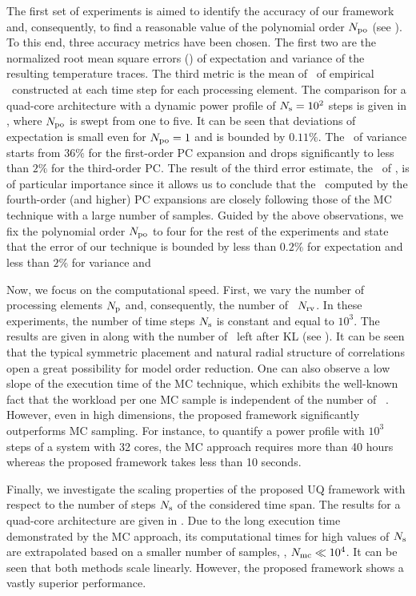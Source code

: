 
The first set of experiments is aimed to identify the accuracy of our framework and, consequently, to find a reasonable value of the polynomial order ${N_\text{po}}$ (see ). To this end, three accuracy metrics have been chosen. The first two are the normalized root mean square errors (\nrmses) of expectation and variance of the resulting temperature traces. The third metric is the mean of \nrmses\ of empirical \pdfs\ constructed at each time step for each processing element. The comparison for a quad-core architecture with a dynamic power profile of $N_\text{s} = 10^2$ steps is given in , where ${N_\text{po}}$ is swept from one to five. It can be seen that deviations of expectation is small even for ${N_\text{po}} = 1$ and is bounded by $0.11\%$. The \nrmse\ of variance starts from $36\%$ for the first-order PC expansion and drops significantly to less than $2\%$ for the third-order PC. The result of the third error estimate, the \nrmses\ of \pdfs, is of particular importance since it allows us to conclude that the \pdfs\ computed by the fourth-order (and higher) PC expansions are closely following those of the MC technique with a large number of samples. Guided by the above observations, we fix the polynomial order ${N_\text{po}}$ to four for the rest of the experiments and state that the error of our technique is bounded by less than $0.2\%$ for expectation and less than $2\%$ for variance and \pdf


Now, we focus on the computational speed. First, we vary the number of processing elements ${N_\text{p}}$ and, consequently, the number of \rvs\ ${N_\text{rv}}$. In these experiments, the number of time steps $N_\text{s}$ is constant and equal to $10^3$. The results are given in  along with the number of \rvs\ left after KL (see ). It can be seen that the typical symmetric placement and natural radial structure of correlations \cite{cheng2011} open a great possibility for model order reduction. One can also observe a low slope of the execution time of the MC technique, which exhibits the well-known fact that the workload per one MC sample is independent of the number of \rvs\ \cite{maitre2010}. However, even in high dimensions, the proposed framework significantly outperforms MC sampling. For instance, to quantify a power profile with $10^3$ steps of a system with 32 cores, the MC approach requires more than 40 hours whereas the proposed framework takes less than 10 seconds.

Finally, we investigate the scaling properties of the proposed UQ framework with respect to the number of steps $N_\text{s}$ of the considered time span. The results for a quad-core architecture are given in . Due to the long execution time demonstrated by the MC approach, its computational times for high values of $N_\text{s}$ are extrapolated based on a smaller number of samples, \ie, $N_\text{mc} \ll 10^4$. It can be seen that both methods scale linearly. However, the proposed framework shows a vastly superior performance.
